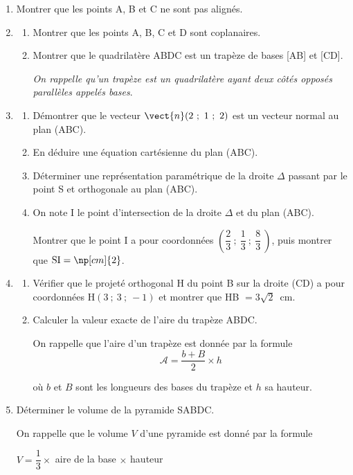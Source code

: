 \begin{enumerate}
\item Montrer que les points A, B et C ne sont pas alignés.
\item
	\begin{enumerate}
		\item Montrer que les points A, B, C et D sont coplanaires.
		\item Montrer que le quadrilatère ABDC est un trapèze de bases [AB] et [CD].

\emph{On rappelle qu'un trapèze est un quadrilatère ayant deux côtés opposés parallèles appelés bases}.
	\end{enumerate}
\item
	\begin{enumerate}
		\item Démontrer que le vecteur $\vect{n}(2~;~1~;~2)$ est un vecteur normal au plan (ABC).
		\item En déduire une équation cartésienne du plan (ABC).
		\item Déterminer une représentation paramétrique de la droite $\Delta$ passant par le point S et orthogonale au plan (ABC).
		\item On note I le point d'intersection de la droite $\Delta$ et du plan (ABC).

Montrer que le point I a pour coordonnées $\left(\dfrac23~;~\dfrac13~;~\dfrac83~\right)$, puis montrer que $\mathrm{SI} = \np[cm]{2}$.
		\end{enumerate}
\item
	\begin{enumerate}
		\item Vérifier que le projeté orthogonal H du point B sur la droite (CD) a pour coordonnées H$(3~;~3~;~-1)$ et montrer que HB $= 3\sqrt 2$~cm.
		\item Calculer la valeur exacte de l'aire du trapèze ABDC.

On rappelle que l'aire d'un trapèze est donnée par la formule
\[\mathcal{A} = \dfrac{b + B}{2} \times h\]

où $b$ et $B$ sont les longueurs des bases du trapèze et $h$ sa hauteur.
		\end{enumerate}
\item Déterminer le volume de la pyramide SABDC.

On rappelle que le volume $V$ d'une pyramide est donné par la formule

\begin{center}$V = \dfrac13 \times$  aire de la base $\times$ hauteur\end{center}
\end{enumerate}

\bigskip
